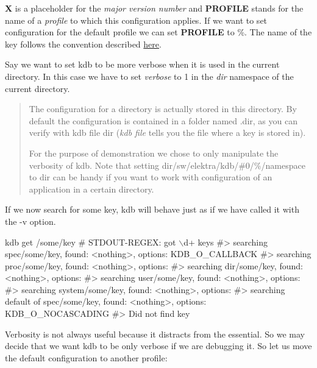 {\bfseries X} is a placeholder for the {\itshape major version number} and {\bfseries P\+R\+O\+F\+I\+LE} stands for the name of a {\itshape profile} to which this configuration applies. If we want to set configuration for the default profile we can set {\bfseries P\+R\+O\+F\+I\+LE} to \%. The name of the key follows the convention described \hyperlink{doc_help_elektra-key-names_md}{here}.

Say we want to set {\ttfamily kdb} to be more verbose when it is used in the current directory. In this case we have to set {\itshape verbose} to 1 in the {\itshape dir} namespace of the current directory.




\begin{quote}
The configuration for a directory is actually stored in this directory. By default the configuration is contained in a folder named {\ttfamily .dir}, as you can verify with {\ttfamily kdb file dir} ({\itshape kdb file} tells you the file where a key is stored in).

For the purpose of demonstration we chose to only manipulate the verbosity of kdb. Note that setting {\ttfamily dir/sw/elektra/kdb/\#0/\%/namespace} to {\ttfamily dir} can be handy if you want to work with configuration of an application in a certain directory. \end{quote}


If we now search for some key, {\ttfamily kdb} will behave just as if we have called it with the {\ttfamily -\/v} option.


\begin{DoxyCode}
kdb get /some/key
# STDOUT-REGEX: got \(\backslash\)d+ keys
#> searching spec/some/key, found: <nothing>, options: KDB\_O\_CALLBACK
#>     searching proc/some/key, found: <nothing>, options:
#>     searching dir/some/key, found: <nothing>, options:
#>     searching user/some/key, found: <nothing>, options:
#>     searching system/some/key, found: <nothing>, options:
#>     searching default of spec/some/key, found: <nothing>, options: KDB\_O\_NOCASCADING
#> Did not find key
\end{DoxyCode}


Verbosity is not always useful because it distracts from the essential. So we may decide that we want {\ttfamily kdb} to be only verbose if we are debugging it. So let us move the default configuration to another profile\+:


